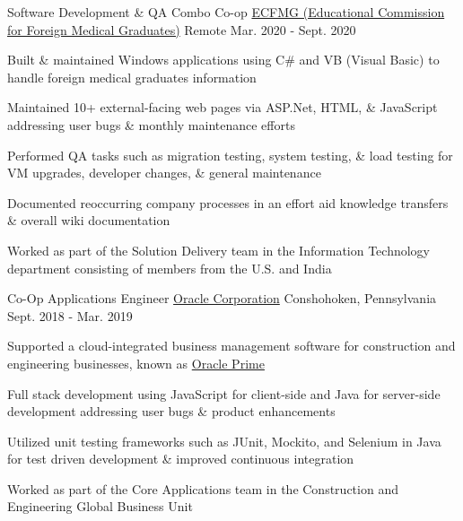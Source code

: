 

\begin{cventries}
  \cventry
    {Software Development \& QA Combo Co-op} %
    {\href{https://ecfmg.org/}{ECFMG (Educational Commission for Foreign Medical Graduates)}} %
    {Remote} %
    {Mar. 2020 - Sept. 2020} %
    {
      \begin{cvitems} %
        \item Built \& maintained Windows applications using C\# and VB (Visual Basic) to handle foreign medical graduates information
        \item Maintained 10+ external-facing web pages via ASP.Net, HTML, \& JavaScript addressing user bugs \& monthly maintenance efforts
        \item Performed QA tasks such as migration testing, system testing, \& load testing for VM upgrades, developer changes, \& general maintenance
        \item Documented reoccurring company processes in an effort aid knowledge transfers \& overall wiki documentation
        \item Worked as part of the Solution Delivery team in the Information Technology department consisting of members from the U.S. and India
      \end{cvitems}
    }

  \cventry
    {Co-Op Applications Engineer} %
    {\href{https://www.oracle.com/}{Oracle Corporation}} %
    {Conshohoken, Pennsylvania} %
    {Sept. 2018 - Mar. 2019} %
    {
      \begin{cvitems} %
        \item Supported a cloud-integrated business management software for construction and engineering businesses, known as \href{https://docs.oracle.com/en/industries/construction-engineering/oracle-prime/index.html}{Oracle Prime}
        \item Full stack development using JavaScript for client-side and Java for server-side development addressing user bugs \& product enhancements
        \item Utilized unit testing frameworks such as JUnit, Mockito, and Selenium in Java for test driven development \& improved continuous integration
        \item Worked as part of the Core Applications team in the Construction and Engineering Global Business Unit
      \end{cvitems}
    }


\end{cventries}
